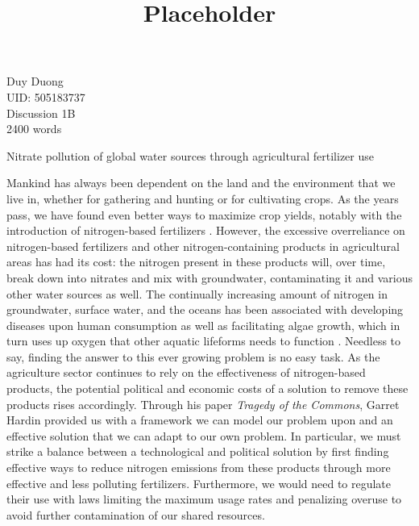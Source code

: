 \documentclass[12pt]{article}
\begin{document}
	\title{Placeholder}
	\setlength{\parindent}{0pt}
	\begin{flushleft}
		Duy Duong\\UID: 505183737\\Discussion 1B\\2400 words
	\end{flushleft}
	
	\hfill
	\begin{center}
		{\Huge Nitrate pollution of global water sources through agricultural fertilizer use}
	\end{center}
	\hfill
	 \setlength{\parindent}{4em}
	\setlength{\parskip}{1em}
	
	Mankind has always been dependent on the land and the environment that we live in, whether for gathering and hunting or for cultivating crops. As the years pass, we have found even better ways to maximize crop yields, notably with the introduction of nitrogen-based fertilizers . However, the excessive overreliance on nitrogen-based fertilizers and other nitrogen-containing products in agricultural areas has had its cost: the nitrogen present in these products will, over time, break down into nitrates and mix with groundwater, contaminating it and various other water sources as well. The continually increasing amount of nitrogen in groundwater, surface water, and the oceans has been associated with developing diseases upon human consumption as well as facilitating algae growth, which in turn uses up oxygen that other aquatic lifeforms needs to function \cite{skipton08}. Needless to say, finding the answer to this ever growing problem is no easy task. As the agriculture sector continues to rely on the effectiveness of nitrogen-based products, the potential political and economic costs of a solution to remove these products rises accordingly. Through his paper \textit{Tragedy of the Commons}, Garret Hardin provided us with a framework we can model our problem upon and an effective solution that we can adapt to our own problem. In particular, we must strike a balance between a technological and political solution by first finding effective ways to reduce nitrogen emissions from these products through more effective and less polluting fertilizers. Furthermore, we would need to regulate their use with laws limiting the maximum usage rates and penalizing overuse to avoid further contamination of our shared resources. 
	
\end{document}
